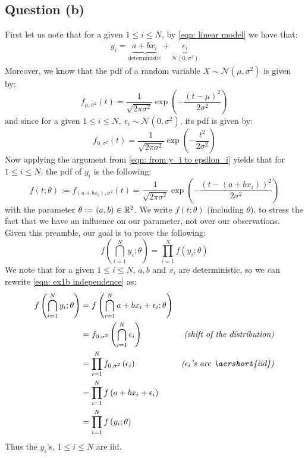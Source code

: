 \documentclass[12pt]{article}
\begin{document}
\subsection{Question (b)}
First let us note that for a given \(1 \leq i \leq N\), by \eqref{eqn: linear model} we have that:
\begin{align}
    \label{eqn: from y_i to epsilon_i}
    y_i = \underbrace{a + bx_i}_{\textrm{deterministic}} + \underbrace{\epsilon_i}_{\mathcal{N}(0, \sigma^2)}
\end{align}
Moreover, we know that the \gls{pdf} of a random variable \(X \sim \mathcal{N}(\mu, \sigma^2)\) is given by:
\begin{equation*}
    f_{\mu, \sigma^2}(t)=\frac{1}{\sqrt{2 \pi \sigma^{2}}} \exp \left(-\frac{(t-\mu)^{2}}{2 \sigma^{2}}\right)
\end{equation*}
and since for a given \(1 \leq i \leq N, \ \epsilon_i  \sim \mathcal{N}(0, \sigma^2)\), its \gls{pdf} is given by:
\begin{equation*}
    f_{0, \sigma^2}(t) = \frac{1}{\sqrt{2 \pi \sigma^{2}}} \exp \left(-\frac{t^{2}}{2 \sigma^{2}}\right)
\end{equation*}
Now applying the argument from \eqref{eqn: from y_i to epsilon_i} yields that for \(1 \leq i \leq N\), the \gls{pdf} of \(y_i\) is the following:
\begin{equation*}
    f(t; \theta) := f_{(a + bx_i), \sigma^2}(t) = \frac{1}{\sqrt{2 \pi \sigma^{2}}} \exp \left(-\frac{\left(t - (a+bx_i)\right)^{2}}{2 \sigma^{2}}\right)
\end{equation*}
with the parameter \(\theta := (a,b) \in \mathbb{R}^2\). We write \(f(t; \theta)\) (including \(\theta\)), to stress the fact that we have an influence on our parameter, not over our observations. \\
Given this preamble, our goal is to prove the following:
\begin{equation}
    \label{eqn: ex1b independence}
    f\left( \bigcap_{i=1}^N y_i ; \theta \right) = \prod_{i=1}^N f \left(y_i; \theta\right)
\end{equation}
We note that for a given \(1 \leq i \leq N\), \(a, b\) and \(x_i\) are deterministic, so we can rewrite \eqref{eqn: ex1b independence} as:
\begin{align}
    f\left( \bigcap_{i=1}^N y_i ; \theta \right)
    \nonumber
     & = f\left( \bigcap_{i=1}^N a + bx_i + \epsilon_i ; \theta \right)                                                  \\
    \nonumber
     & = f_{0, \sigma^2} \left( \bigcap_{i=1}^N \epsilon_i \right)      & \textit{(shift of the distribution)}           \\
    \nonumber
     & = \prod_{i=1}^N f_{0, \sigma^2} \left(\epsilon_i \right)         & \textit{(\(\epsilon_i\)'s are \acrshort{iid})} \\
    \nonumber
     & = \prod_{i=1}^N f \left(a + bx_i + \epsilon_i \right)                                                             \\
    \label{eqn: ex1b independence rewritten}
     & = \prod_{i=1}^N f \left(y_i; \theta\right)
\end{align}
Thus the \(y_i\)'s, \(1 \leq i \leq N\) are \gls{iid}.
\end{document}

